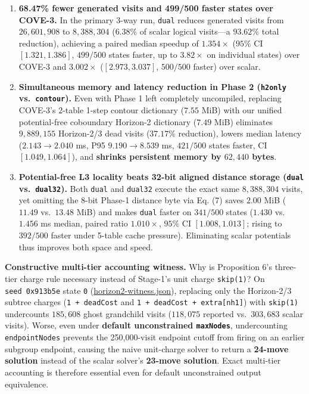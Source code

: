 \documentclass[10pt,twocolumn,letterpaper]{article}
\providecommand{\tightlist}{\setlength{\itemsep}{0pt}\setlength{\parskip}{0pt}}
\begin{document}
\begin{enumerate}
\def\labelenumi{\arabic{enumi}.}
\tightlist
\item
  \textbf{68.47\% fewer generated visits and 499/500 faster states over
  COVE-3.} In the primary 3-way run, \texttt{dual} reduces generated
  visits from \(26,601,908\) to \(8,388,304\) (\(6.38\%\) of scalar
  logical visits---a \(93.62\%\) total reduction), achieving a paired
  median speedup of \(1.354\times\) (\(95\%\) CI \([1.321, 1.386]\),
  \(499/500\) states faster, up to \(3.82\times\) on individual states)
  over COVE-3 and \(3.002\times\) (\([2.973, 3.037]\), \(500/500\)
  faster) over scalar.
\item
  \textbf{Simultaneous memory and latency reduction in Phase 2
  (\texttt{h2only} vs.~\texttt{contour}).} Even with Phase 1 left
  completely uncompiled, replacing COVE-3's 2-table 1-step contour
  dictionary (\(7.55\) MiB) with our unified potential-free coboundary
  Horizon-2 dictionary (\(7.49\) MiB) eliminates \(9,889,155\)
  Horizon-2/3 dead visits (\(37.17\%\) reduction), lowers median latency
  (\(2.143 \to 2.040\) ms, P95 \(9.190 \to 8.539\) ms, \(421/500\)
  states faster, CI \([1.049, 1.064]\)), and \textbf{shrinks persistent
  memory by \(62,440\) bytes}.
\item
  \textbf{Potential-free L3 locality beats 32-bit aligned distance
  storage (\texttt{dual} vs.~\texttt{dual32}).} Both \texttt{dual} and
  \texttt{dual32} execute the exact same \(8,388,304\) visits, yet
  omitting the 8-bit Phase-1 distance byte via Eq. (7) saves \(2.00\)
  MiB (\(11.49\) vs.~\(13.48\) MiB) and makes \texttt{dual} faster on
  \(341/500\) states (\(1.430\) vs.~\(1.456\) ms median, paired ratio
  \(1.010\times\), \(95\%\) CI \([1.008, 1.013]\); rising to \(392/500\)
  faster under 5-table cache pressure). Eliminating scalar potentials
  thus improves both space and speed.
\end{enumerate}

\textbf{Constructive multi-tier accounting witness.} Why is Proposition
6's three-tier charge rule necessary instead of Stage-1's unit charge
\texttt{skip(1)}? On \texttt{seed\ 0x913b5e} state \texttt{0}
(\href{https://github.com/nahin333/rubikscube/blob/main/research/results/horizon2-witness.json}{horizon2-witness.json}),
replacing only the Horizon-2/3 subtree charges (\texttt{1\ +\ deadCost}
and \texttt{1\ +\ deadCost\ +\ extra{[}nh1{]}}) with \texttt{skip(1)}
undercounts \(185,608\) ghost grandchild visits (\(118,075\) reported
vs.~\(303,683\) scalar visits). Worse, even under \textbf{default
unconstrained \texttt{maxNodes}}, undercounting \texttt{endpointNodes}
prevents the 250,000-visit endpoint cutoff from firing on an earlier
subgroup endpoint, causing the naive unit-charge solver to return a
\textbf{24-move solution} instead of the scalar solver's \textbf{23-move
solution}. Exact multi-tier accounting is therefore essential even for
default unconstrained output equivalence.
\end{document}
